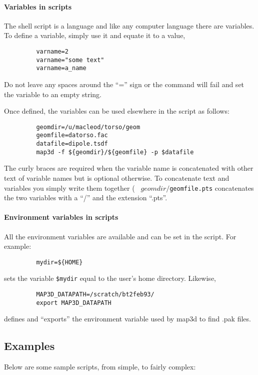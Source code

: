 \paragraph{Variables in scripts }  The shell script is a language and like
any computer language there are variables.  To define a variable, simply
use it and equate it to a value, \eg{}
\begin{verbatim}
         varname=2
         varname="some text"
         varname=a_name
\end{verbatim}

Do not leave any spaces around the ``='' sign or the command will fail and
set the variable to an empty string.

Once defined, the variables can be used elsewhere in the script as follows:
\begin{verbatim}
         geomdir=/u/macleod/torso/geom
         geomfile=datorso.fac
         datafile=dipole.tsdf
         map3d -f ${geomdir}/${geomfile} -p $datafile
\end{verbatim}

The curly braces are required when the variable name is concatenated with
other text of variable names but is optional otherwise.  To concatenate
text and variables you simply write them together (\eg{} {\tt
${geomdir}/${geomfile}.pts} concatenates the two variables with a ``/'' and
the extension ``.pts''.

\paragraph{Environment variables in scripts}

All the environment variables are available and can be set in the script.
For example:
\begin{verbatim}
         mydir=${HOME}
\end{verbatim}
sets the variable {\tt \$mydir} equal to the user's home directory.
Likewise,
\begin{verbatim}
         MAP3D_DATAPATH=/scratch/bt2feb93/
         export MAP3D_DATAPATH
\end{verbatim}
defines and ``exports'' the environment variable used by map3d to find
.pak files. 

\subsection{Examples}

Below are some sample scripts, from simple, to fairly complex:

